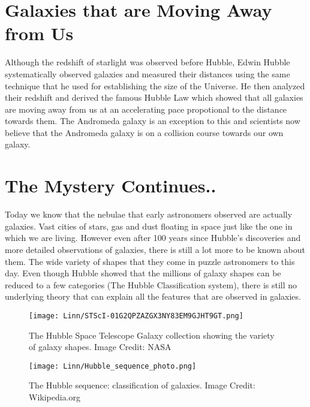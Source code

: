 \documentclass{../template/texnote}
\begin{document}
\section{Galaxies that are Moving Away from Us}

Although the redshift of starlight was observed before Hubble, Edwin Hubble systematically observed galaxies and measured their distances using the same technique that he used for establishing the size of the Universe. He then analyzed their redshift and derived the famous Hubble Law which showed that all galaxies are moving away from us at an accelerating pace propotional to the distance towards them. The Andromeda galaxy is an exception to this and scientists now believe that the Andromeda galaxy is on a collision course towards our own galaxy. 

\section{The Mystery Continues.. }

Today we know that the nebulae that early astronomers observed are actually galaxies. Vast cities of stars, gas and dust floating in space just like the one in which we are living. However
even after 100 years since Hubble's discoveries and more detailed observations of galaxies, there is still a lot more to be known about them. The wide variety of shapes that they come in puzzle astronomers to this day. Even though Hubble showed that the millions of galaxy shapes can be reduced to a few categories (The Hubble Classification system), there is still no underlying theory that can explain all the features that are observed in galaxies. 


 \begin{figure}
     \centering
     \texttt{[image: Linn/STScI-01G2QPZAZGX3NY83EM9GJHT9GT.png]}
     \label{fig:mozaic}
     \caption{The Hubble Space Telescope Galaxy collection showing the variety of galaxy shapes. Image Credit: NASA}
 \end{figure}


\begin{figure}
     \centering
     \texttt{[image: Linn/Hubble\_sequence\_photo.png]}
     \label{fig:tuning-fork}
     \caption{The Hubble sequence: classification of galaxies. Image Credit: Wikipedia.org}
 \end{figure}
\end{document}
